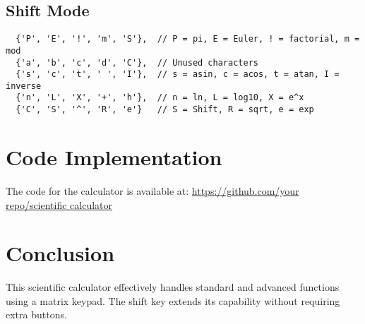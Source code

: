 \documentclass[journal,12pt,onecolumn]{IEEEtran}
\theoremstyle{remark}
\begin{document}
\subsection{Shift Mode}
\begin{verbatim}
  {'P', 'E', '!', 'm', 'S'},  // P = pi, E = Euler, ! = factorial, m = mod
  {'a', 'b', 'c', 'd', 'C'},  // Unused characters
  {'s', 'c', 't', ' ', 'I'},  // s = asin, c = acos, t = atan, I = inverse
  {'n', 'L', 'X', '+', 'h'},  // n = ln, L = log10, X = e^x
  {'C', 'S', '^', 'R', 'e'}   // S = Shift, R = sqrt, e = exp
\end{verbatim}




\section{Code Implementation}



The  code for the calculator is available at:  
\url{https://github.com/your repo/scientific calculator}

\section{Conclusion}
This scientific calculator effectively handles standard and advanced functions using a matrix keypad. The shift key extends its capability without requiring extra buttons. 
\end{document}
